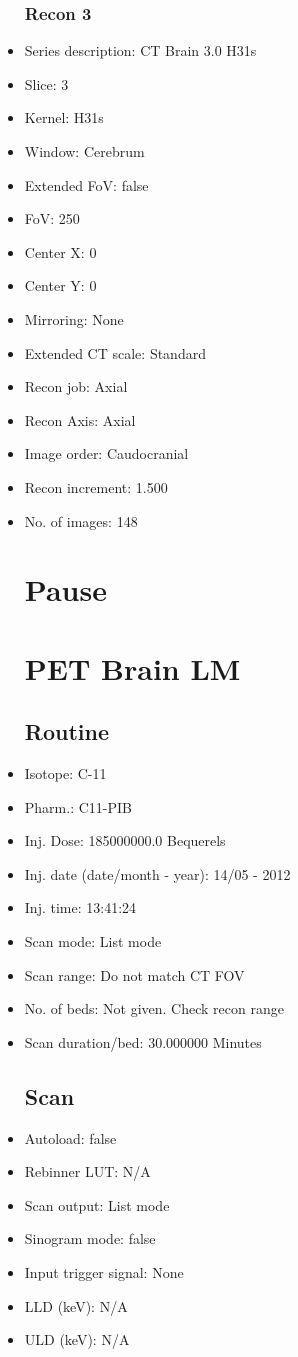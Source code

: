 \documentclass[12pt]{article}
\begin{document}
\begin{itemize}
\subsubsection{Recon 3}
\item Series description: CT Brain 3.0 H31s
\item Slice: 3
\item Kernel: H31s
\item Window: Cerebrum
\item Extended FoV: false
\item FoV: 250
\item Center X: 0
\item Center Y: 0
\item Mirroring: None
\item Extended CT scale: Standard
\item Recon job: Axial
\item Recon Axis: Axial
\item Image order: Caudocranial
\item Recon increment: 1.500
\item No. of images: 148
\section{Pause}
\section{PET Brain LM}\subsection{Routine}
\item Isotope: C-11
\item Pharm.: C11-PIB
\item Inj. Dose: 185000000.0 Bequerels
\item Inj. date (date/month - year): 14/05 - 2012
\item Inj. time: 13:41:24
\item Scan mode: List mode
\item Scan range: Do not match CT FOV
\item No. of beds: Not given. Check recon range
\item Scan duration/bed: 30.000000 Minutes
\subsection{Scan}
\item Autoload: false
\item Rebinner LUT: N/A
\item Scan output: List mode
\item Sinogram mode: false
\item Input trigger signal: None
\item LLD (keV): N/A
\item ULD (keV): N/A

\end{itemize}
\end{document}
